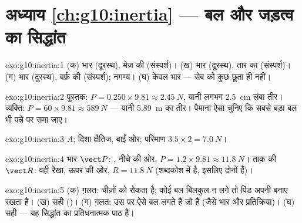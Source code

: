\section*{अध्याय \ref{ch:g10:inertia} --- बल और जड़त्व का सिद्धांत}

\begin{solution}{exo:g10:inertia:1}
(क) भार (दूरस्थ), मेज़ की  (संस्पर्श)।
(ख) भार (दूरस्थ), तार का  (संस्पर्श)। (ग) भार
(दूरस्थ), बर्फ़ की  (संस्पर्श); 
नगण्य। (घ) केवल भार --- सेब को कुछ छूता ही नहीं।
\end{solution}

\begin{solution}{exo:g10:inertia:2}
पुस्तक: $P = 0.250 \times 9.81 \approx \qty{2.45}{N}$, यानी लगभग \qty{2.5}{cm} लंबा तीर। व्यक्ति: $P = 60 \times 9.81 \approx \qty{589}{N}$ --- यानी
\qty{5.89}{m} का तीर। पैमाना ऐसा चुनिए कि सबसे बड़ा बल भी पन्ने पर समा
जाए।
\end{solution}

\begin{solution}{exo:g10:inertia:3}
 $A$; दिशा क्षैतिज, बाईं ओर; परिमाण $3.5 \times 2 = \qty{7.0}{N}$।
\end{solution}

\begin{solution}{exo:g10:inertia:4}
भार $\vect P$: , नीचे की ओर, $P = 1.2 \times 9.81 \approx
\qty{11.8}{N}$। ताक़ की
 $\vect R$: वही रेखा, ऊपर की ओर, $R = \qty{11.8}{N}$
(शब्दकोश  में है, इसलिए दोनों  हैं)।
\end{solution}

\begin{solution}{exo:g10:inertia:5}
(क) ग़लत: चीज़ों को  रोकता है; कोई बल बिलकुल न लगे
तो पिंड अपनी  बनाए रखता है। (ख) सही ()। (ग) ग़लत: उस पर ऐसे बल लगते हैं जो
\emph{} हैं (जैसे भार और प्रतिक्रिया)। (घ) सही
--- यह सिद्धांत का प्रतिधनात्मक पाठ है।
\end{solution}

